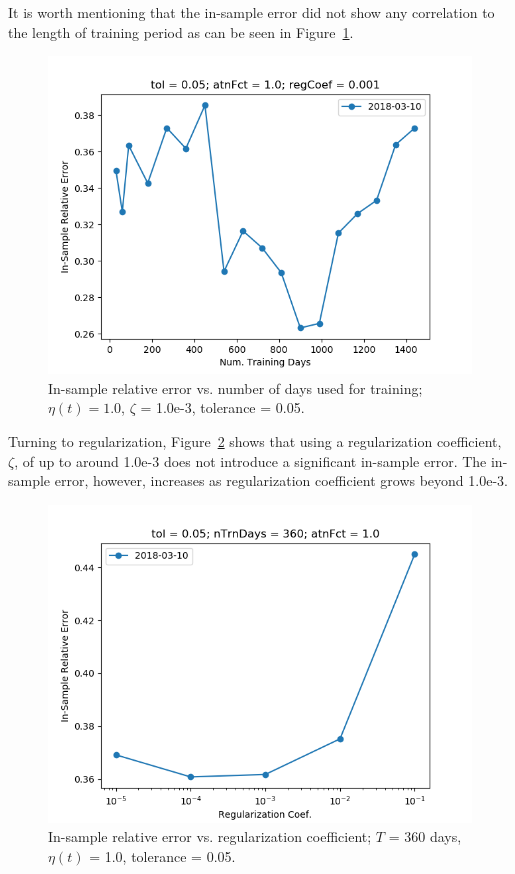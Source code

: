 \documentclass{article}
\begin{document}
It is worth mentioning that the in-sample error did not show any
correlation to the length of training period as can be seen in
Figure~\ref{fig:nTrnDays-sensitivity-error}.

\begin{figure}\label{fig:nTrnDays-sensitivity-error}
\includegraphics[bb=0 0 640 480]{figures/nTrnDays-sensitivity-error.png}
\caption{In-sample relative error vs. number of days used for
  training; $\eta(t) = 1.0$, $\zeta$ = 1.0e-3, tolerance = 0.05.}
\end{figure}

Turning to regularization, Figure~\ref{fig:regCoef-sensitivity-error}
shows that using a regularization coefficient, $\zeta$, of up to
around 1.0e-3 does not introduce a significant in-sample error. The
in-sample error, however, increases as regularization coefficient
grows beyond 1.0e-3.

\begin{figure}\label{fig:regCoef-sensitivity-error}
\includegraphics[bb=0 0 640 480]{figures/regCoef-sensitivity-error.png}
\caption{In-sample relative error vs. regularization coefficient; $T$
  = 360 days, $\eta(t)$ = 1.0, tolerance = 0.05.}
\end{figure}
\end{document}

